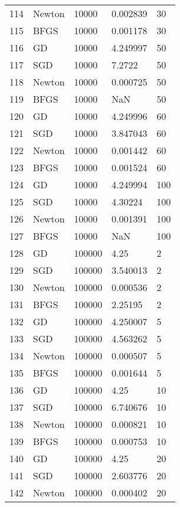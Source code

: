 \begin{tabular}{lllll}
114 &  Newton &    10000 &   0.002839 &     30 \\
115 &    BFGS &    10000 &   0.001178 &     30 \\
116 &      GD &    10000 &   4.249997 &     50 \\
117 &     SGD &    10000 &     7.2722 &     50 \\
118 &  Newton &    10000 &   0.000725 &     50 \\
119 &    BFGS &    10000 &        NaN &     50 \\
120 &      GD &    10000 &   4.249996 &     60 \\
121 &     SGD &    10000 &   3.847043 &     60 \\
122 &  Newton &    10000 &   0.001442 &     60 \\
123 &    BFGS &    10000 &   0.001524 &     60 \\
124 &      GD &    10000 &   4.249994 &    100 \\
125 &     SGD &    10000 &    4.30224 &    100 \\
126 &  Newton &    10000 &   0.001391 &    100 \\
127 &    BFGS &    10000 &        NaN &    100 \\
128 &      GD &   100000 &       4.25 &      2 \\
129 &     SGD &   100000 &   3.540013 &      2 \\
130 &  Newton &   100000 &   0.000536 &      2 \\
131 &    BFGS &   100000 &    2.25195 &      2 \\
132 &      GD &   100000 &   4.250007 &      5 \\
133 &     SGD &   100000 &   4.563262 &      5 \\
134 &  Newton &   100000 &   0.000507 &      5 \\
135 &    BFGS &   100000 &   0.001644 &      5 \\
136 &      GD &   100000 &       4.25 &     10 \\
137 &     SGD &   100000 &   6.740676 &     10 \\
138 &  Newton &   100000 &   0.000821 &     10 \\
139 &    BFGS &   100000 &   0.000753 &     10 \\
140 &      GD &   100000 &       4.25 &     20 \\
141 &     SGD &   100000 &   2.603776 &     20 \\
142 &  Newton &   100000 &   0.000402 &     20 \\

\end{tabular}

